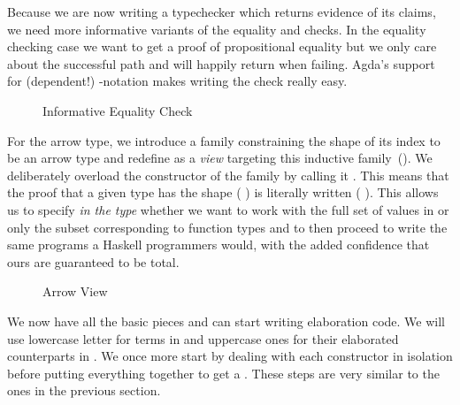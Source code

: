Because we are now writing a typechecker which returns evidence of its
claims, we need more informative variants of the equality and
 checks.
%
In the equality checking case we want to get a proof of propositional
equality but we only care about the successful path and will happily
return  when failing. Agda's support for (dependent!)
-notation makes writing the check really easy.

\begin{figure}[h]
\caption{Informative Equality Check\label{fig:informativeeqcheck}}
\end{figure}

For the arrow type, we introduce a family  constraining the
shape of its index to be an arrow type and redefine  as
a \emph{view} targeting this inductive
family~(\cite{DBLP:conf/popl/Wadler87,DBLP:journals/jfp/McBrideM04}).
%
We deliberately overload the constructor of the  family by calling
it . This means that the proof that a given type has the shape
{(  )} is literally written {(  )}.
This allows us to specify \emph{in the type} whether we want to work with the
full set of values in  or only the subset corresponding to function
types and to then proceed to write the same programs a Haskell programmers would,
with the added confidence that ours are guaranteed to be total.

\begin{figure}[h]
\begin{minipage}[t]{0.45\textwidth}
\end{minipage}\hfill\begin{minipage}[t]{0.45\textwidth}
\end{minipage}
\caption{Arrow View\label{fig:informativecheck}}
\end{figure}

We now have all the basic pieces and can start writing elaboration code. We
will use lowercase letter for terms in  and uppercase ones for their
elaborated counterparts in . We once more start by dealing with each
constructor in isolation before putting everything together to get a
. These steps are very similar to the ones in the previous
section.

